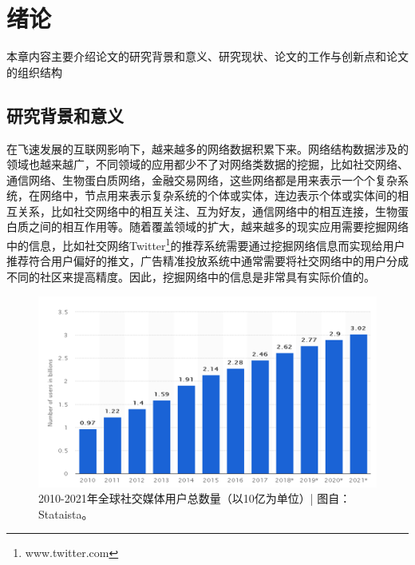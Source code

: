 \chapter{绪论}

本章内容主要介绍论文的研究背景和意义、研究现状、论文的工作与创新点和论文的组织结构
\section{研究背景和意义}
在飞速发展的互联网影响下，越来越多的网络数据积累下来。网络结构数据涉及的领域也越来越广，不同领域的应用都少不了对网络类数据的挖掘，比如社交网络、通信网络、生物蛋白质网络，金融交易网络，这些网络都是用来表示一个个复杂系统，在网络中，节点用来表示复杂系统的个体或实体，连边表示个体或实体间的相互关系，比如社交网络中的相互关注、互为好友，通信网络中的相互连接，生物蛋白质之间的相互作用等。随着覆盖领域的扩大，越来越多的现实应用需要挖掘网络中的信息，比如社交网络Twitter\footnote{www.twitter.com}的推荐系统需要通过挖掘网络信息而实现给用户推荐符合用户偏好的推文，广告精准投放系统中通常需要将社交网络中的用户分成不同的社区来提高精度。因此，挖掘网络中的信息是非常具有实际价值的。

\begin{figure}
	\centering
	\includegraphics[width=5.5in]{figures/social_media_stat}
	\caption{2010-2021年全球社交媒体用户总数量（以10亿为单位）| 图自：Stataista。}
\end{figure}

